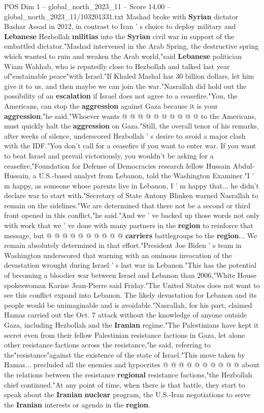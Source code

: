 \begin{textsample}{POS Dim 1 – global\_north\_2023\_11 – Score 14.00 – global\_north\_2023\_11/103201331.txt}
Mashad broke with \textbf{Syrian} dictator Bashar Assad in 2012, in contrast to Iran ' s choice to deploy military and \textbf{Lebanese} Hezbollah \textbf{militias} into the \textbf{Syrian} civil war in support of the embattled dictator."Mashad intervened in the Arab Spring, the destructive spring which wanted to ruin and weaken the Arab world,"said \textbf{Lebanese} politician Wiam Wahhab, who is reputedly close to Hezbollah and talked last year of"sustainable peace"with Israel."If Khaled Mashal has 30 billion dollars, let him give it to us, and then maybe we can join the war."Nasrallah did hold out the possibility of an \textbf{escalation} if Israel does not agree to a ceasefire."You, the Americans, can stop the \textbf{aggression} against Gaza because it is your \textbf{aggression},"he said."Whoever wants @ @ @ @ @ @ @ @ @ @ to the Americans, must quickly halt the \textbf{aggression} on Gaza."Still, the overall tenor of his remarks, after weeks of silence, underscored Hezbollah ' s desire to avoid a major clash with the IDF."You don't call for a ceasefire if you want to enter war.
If you want to beat Israel and prevail victoriously, you wouldn't be asking for a ceasefire,"Foundation for Defense of Democracies research fellow Hussain Abdul-Hussain, a U.S.-based analyst from Lebanon, told the Washington Examiner."I ' m happy, as someone whose parents live in Lebanon, I ' m happy that... he didn't declare war to start with."Secretary of State Antony Blinken warned Nasrallah to remain on the sidelines."We are determined that there not be a second or third front opened in this conflict,"he said."And we ' ve backed up those words not only with work that we ' ve done with many partners in the \textbf{region} to reinforce that message, but @ @ @ @ @ @ @ @ @ @ \textbf{carriers} battlegroups to the \textbf{region}...
We remain absolutely determined in that effort."President Joe Biden ' s team in Washington underscored that warning with an ominous invocation of the devastation wrought during Israel ' s last war in Lebanon."This has the potential of becoming a bloodier war between Israel and Lebanon than 2006,"White House spokeswoman Karine Jean-Pierre said Friday."The United States does not want to see this conflict expand into Lebanon.
The likely devastation for Lebanon and its people would be unimaginable and is avoidable."Nasrallah, for his part, claimed Hamas carried out the Oct. 7 attack without the knowledge of anyone outside Gaza, including Hezbollah and the \textbf{Iranian} regime."The Palestinians have kept it secret even from their fellow Palestinian resistance factions in Gaza, let alone other resistance factions across the resistance,"he said, referring to the"resistance"against the existence of the state of Israel."This move taken by Hamas... precluded all the enemies and hypocrites @ @ @ @ @ @ @ @ @ @ about the relations between the resistance \textbf{regional} resistance factions,"the Hezbollah chief continued."At any point of time, when there is that battle, they start to speak about the \textbf{Iranian} \textbf{nuclear} program, the U.S.-Iran negotiations to serve the \textbf{Iranian} interests or agenda in the \textbf{region}.

\end{textsample}
